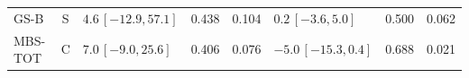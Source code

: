 \begin{longtable}{lcp{37mm}rrp{37mm}rr}
GS-B & S & \(4.6\,[-12.9,57.1]\) & 0.438 & 0.104 & \(0.2\,[-3.6,5.0]\) & 0.500 & 0.062\\
MBS-TOT & C & \(7.0\,[-9.0,25.6]\) & 0.406 & 0.076 & \(-5.0\,[-15.3,0.4]\) & 0.688 & 0.021\\

\end{longtable}

